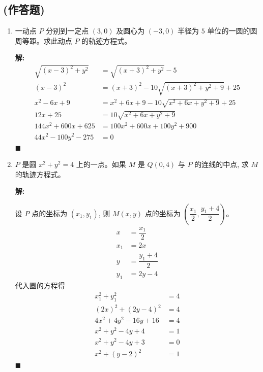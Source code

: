 \documentclass[10pt]{article}
\newcommand{\sol}{\textbf{解:} }
\begin{document}
\subsection*{(作答题)}
\begin{enumerate}
  \item 一动点 $P$ 分别到一定点 $(3,0)$ 及圆心为 $(-3,0)$ 半径为 $5$ 单位的一圆的圆周等距。求此动点 $P$ 的轨迹方程式。

        \sol{}
        \begin{align*}
          \sqrt{(x-3)^{2}+y^{2}} & = \sqrt{(x+3)^{2}+y^{2}} - 5              \\
          (x-3)^{2}              & = (x+3)^{2}-10\sqrt{(x+3)^{2}+y^{2}+9}+25 \\
          x^{2}-6x+9             & = x^{2}+6x+9-10\sqrt{x^{2}+6x+y^{2}+9}+25 \\
          12x + 25               & = 10\sqrt{x^{2}+6x+y^{2}+9}               \\
          144x^{2} + 600x + 625  & = 100x^{2}+600x+100y^{2}+900              \\
          44x^{2} - 100y^2 - 275 & = 0
        \end{align*} \hfill$\blacksquare$

        \newpage
  \item $P$ 是圆 $x^2+y^2=4$ 上的一点。如果 $M$ 是 $Q(0,4)$ 与 $P$ 的连线的中点, 求 $M$ 的轨迹方程式。

        \sol{}

        设 $P$ 点的坐标为 $(x_1, y_1)$, 则 $M(x, y)$ 点的坐标为 $\left(\dfrac{x_1}{2}, \dfrac{y_1+4}{2}\right)$。
        \begin{align*}
          x   & = \dfrac{x_1}{2}   \\
          x_1 & = 2x               \\
          y   & = \dfrac{y_1+4}{2} \\
          y_1 & = 2y-4
        \end{align*}
        代入圆的方程得
        \begin{align*}
          x_1^2 + y_1^2          & = 4 \\
          (2x)^2 + (2y-4)^2      & = 4 \\
          4x^2 + 4y^2 - 16y + 16 & = 4 \\
          x^2 + y^2 - 4y + 4     & = 1 \\
          x^2 + y^2 - 4y + 3     & = 0 \\
          x^2 + (y-2)^2          & = 1
        \end{align*} \hfill$\blacksquare$


\end{enumerate}
\end{document}
